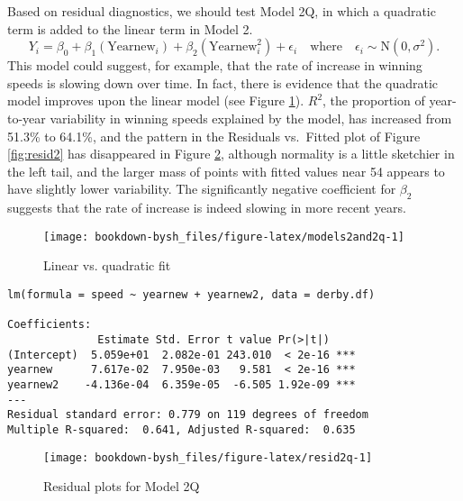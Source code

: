 \documentclass[
]{krantz}
\begin{document}
Based on residual diagnostics, we should test Model 2Q, in which a quadratic term is added to the linear term in Model 2.\\
\begin{equation}
Y_{i}=\beta_{0}+\beta_{1}(\textrm{Yearnew}_{i})+\beta_{2}(\textrm{Yearnew}^2_{i})+\epsilon_{i}\quad \textrm{where}\quad \epsilon_{i}\sim \textrm{N}(0,\sigma^2).
\label{eq:model2Q}
\end{equation}
This model could suggest, for example, that the rate of increase in winning speeds is slowing down over time. In fact, there is evidence that the quadratic model improves upon the linear model (see Figure \ref{fig:models2and2q}). \(R^2\), the proportion of year-to-year variability in winning speeds explained by the model, has increased from 51.3\% to 64.1\%, and the pattern in the Residuals vs.~Fitted plot of Figure \ref{fig:resid2} has disappeared in Figure \ref{fig:resid2q}, although normality is a little sketchier in the left tail, and the larger mass of points with fitted values near 54 appears to have slightly lower variability. The significantly negative coefficient for \(\beta_{2}\) suggests that the rate of increase is indeed slowing in more recent years.

\begin{figure}

{\centering \texttt{[image: bookdown-bysh\_files/figure-latex/models2and2q-1]} 

}

\caption{Linear vs. quadratic fit}\label{fig:models2and2q}
\end{figure}

\begin{verbatim}
lm(formula = speed ~ yearnew + yearnew2, data = derby.df)

Coefficients:
              Estimate Std. Error t value Pr(>|t|)    
(Intercept)  5.059e+01  2.082e-01 243.010  < 2e-16 ***
yearnew      7.617e-02  7.950e-03   9.581  < 2e-16 ***
yearnew2    -4.136e-04  6.359e-05  -6.505 1.92e-09 ***
---
Residual standard error: 0.779 on 119 degrees of freedom
Multiple R-squared:  0.641, Adjusted R-squared:  0.635 
\end{verbatim}

\begin{figure}

{\centering \texttt{[image: bookdown-bysh\_files/figure-latex/resid2q-1]} 

}

\caption{Residual plots for Model 2Q}\label{fig:resid2q}
\end{figure}
\end{document}

